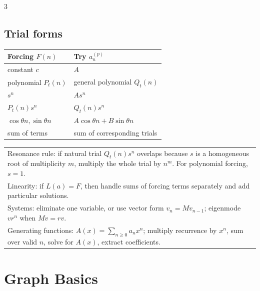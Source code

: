 \documentclass[10pt]{article}
\begin{document}
\begin{multicols*}{3}
\subsection*{Trial forms}
\begin{center}
\begin{tabular}{@{}p{}@{\hspace{0.02\columnwidth}}p{}@{}}
\toprule
Forcing \(F(n)\) & Try \(a_n^{(p)}\)\\
\midrule
constant \(c\) & \(A\)\\
polynomial \(P_t(n)\) & general polynomial \(Q_t(n)\)\\
\(s^n\) & \(As^n\)\\
\(P_t(n)s^n\) & \(Q_t(n)s^n\)\\
\(\cos\theta n,\sin\theta n\) & \(A\cos\theta n+B\sin\theta n\)\\
sum of terms & sum of corresponding trials\\
\bottomrule
\end{tabular}
\end{center}
\begin{tabular}{@{}p{}@{}}
Resonance rule: if natural trial \(Q_t(n)s^n\) overlaps because \(s\) is a homogeneous root of multiplicity \(m\), multiply the whole trial by \(n^m\). For polynomial forcing, \(s=1\).\\
Linearity: if \(L(a)=F\), then handle sums of forcing terms separately and add particular solutions.\\
Systems: eliminate one variable, or use vector form \(v_n=Mv_{n-1}\); eigenmode \(vr^n\) when \(Mv=rv\).\\
Generating functions: \(A(x)=\sum_{n\ge0}a_nx^n\); multiply recurrence by \(x^n\), sum over valid \(n\), solve for \(A(x)\), extract coefficients.\\
\end{tabular}

\section*{Graph Basics}

\end{multicols*}
\end{document}
